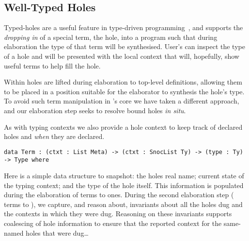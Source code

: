 \subsection{Well-Typed Holes}
\label{sec:design:holes}

Typed-holes are a useful feature in type-driven programming~\cite{DBLP:journals/pacmpl/OmarVCH19}, and supports the \emph{dropping in} of a special term, the hole, into a program such that during elaboration the type of that term will be synthesised.
User's can inspect the type of a hole and will be presented with the local context that will, hopefully, show useful terms to help fill the hole.

Within \Idris{} holes are lifted during elaboration to top-level definitions, allowing them to be placed in a position suitable for the elaborator to synthesis the hole's type.
To avoid such term manipulation in \Velo{}'s core we have taken a different approach, and our elaboration step seeks to resolve bound holes \emph{in situ}.

As with typing contexts we also provide a hole context to keep track of declared holes and \emph{when} they are declared.

\begin{Verbatim}
data Term : (ctxt : List Meta) -> (ctxt : SnocList Ty) -> (type : Ty) -> Type where
\end{Verbatim}

Here  is a simple data structure to snapshot:
the holes real name;
current state of the typing context;
and
the type of the hole itself.
This information is populated during the elaboration of  terms to  ones.
During the second elaboration step ( terms to ), we capture, and reason about, invariants about all the holes dug and the contexts in which they were dug.
Reasoning on these invariants supports coalescing of hole information to ensure that the reported context for the same-named holes that were dug\ldots



